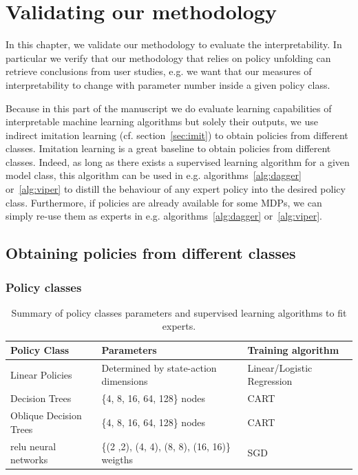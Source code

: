 \chapter{Validating our methodology}\label{sec:exps1}

In this chapter, we validate our methodology to evaluate the interpretability.
In particular we verify that our methodology that relies on policy unfolding can retrieve conclusions from user studies, e.g. we want that our measures of interpretability to change with parameter number inside a given policy class.

Because in this part of the manuscript we do evaluate learning capabilities of interpretable machine learning algorithms but solely their outputs, we use indirect imitation learning (cf. section~\ref{sec:imit}) to obtain policies from different classes.
Imitation learning is a great baseline to obtain policies from different classes.
Indeed, as long as there exists a supervised learning algorithm for a given model class, this algorithm can be used in e.g. algorithms~\ref{alg:dagger} or~\ref{alg:viper} to distill the behaviour of any expert policy into the desired policy class. 
Furthermore, if policies are already available for some MDPs, we can simply re-use them as experts in e.g. algorithms~\ref{alg:dagger} or~\ref{alg:viper}.

\section{Obtaining policies from different classes}

\subsection{Policy classes}
\begin{table}[ht]
\centering
\small
\begin{tabular}{lll}
\hline
\textbf{Policy Class} & \textbf{Parameters} & \textbf{Training algorithm} \\
\hline
Linear Policies & Determined by state-action dimensions & Linear/Logistic Regression \\
Decision Trees & \{4, 8, 16, 64, 128\} nodes & CART \\
Oblique Decision Trees & \{4, 8, 16, 64, 128\} nodes & CART \\
relu neural networks & \{(2 ,2), (4, 4), (8, 8), (16, 16)\} weigths & SGD \\
\hline
\end{tabular}
\caption{Summary of policy classes parameters and supervised learning algorithms to fit experts.}
\label{tab:policy-classes}
\end{table}

